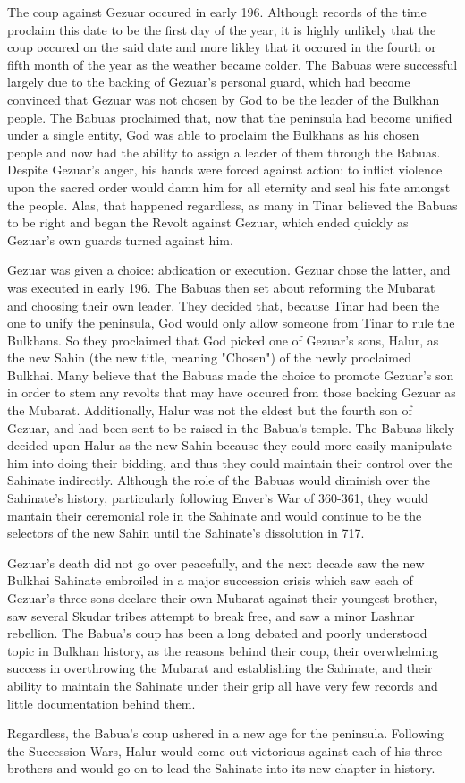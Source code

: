 			The coup against Gezuar occured in early 196. Although records of the time proclaim this date to be the first day of the year, it is highly unlikely that the coup occured on the said date and more likley that it occured in the fourth or fifth month of the year as the weather became colder. The Babuas were successful largely due to the backing of Gezuar's personal guard, which had become convinced that Gezuar was not chosen by God to be the leader of the Bulkhan people. The Babuas proclaimed that, now that the peninsula had become unified under a single entity, God was able to proclaim the Bulkhans as his chosen people and now had the ability to assign a leader of them through the Babuas. Despite Gezuar's anger, his hands were forced against action: to inflict violence upon the sacred order would damn him for all eternity and seal his fate amongst the people. Alas, that happened regardless, as many in Tinar believed the Babuas to be right and began the Revolt against Gezuar, which ended quickly as Gezuar's own guards turned against him. 
			
			Gezuar was given a choice: abdication or execution. Gezuar chose the latter, and was executed in early 196. The Babuas then set about reforming the Mubarat and choosing their own leader. They decided that, because Tinar had been the one to unify the peninsula, God would only allow someone from Tinar to rule the Bulkhans. So they proclaimed that God picked one of Gezuar's sons, Halur, as the new Sahin (the new title, meaning "Chosen") of the newly proclaimed Bulkhai. Many believe that the Babuas made the choice to promote Gezuar's son in order to stem any revolts that may have occured from those backing Gezuar as the Mubarat. Additionally, Halur was not the eldest but the fourth son of Gezuar, and had been sent to be raised in the Babua's temple. The Babuas likely decided upon Halur as the new Sahin because they could more easily manipulate him into doing their bidding, and thus they could maintain their control over the Sahinate indirectly. Although the role of the Babuas would diminish over the Sahinate's history, particularly following Enver's War of 360-361, they would mantain their ceremonial role in the Sahinate and would continue to be the selectors of the new Sahin until the Sahinate's dissolution in 717.
			
			Gezuar's death did not go over peacefully, and the next decade saw the new Bulkhai Sahinate embroiled in a major succession crisis which saw each of Gezuar's three sons declare their own Mubarat against their youngest brother, saw several Skudar tribes attempt to break free, and saw a minor Lashnar rebellion. The Babua's coup has been a long debated and poorly understood topic in Bulkhan history, as the reasons behind their coup, their overwhelming success in overthrowing the Mubarat and establishing the Sahinate, and their ability to maintain the Sahinate under their grip all have very few records and little documentation behind them.
			
			Regardless, the Babua's coup ushered in a new age for the peninsula. Following the Succession Wars, Halur would come out victorious against each of his three brothers and would go on to lead the Sahinate into its new chapter in history.
